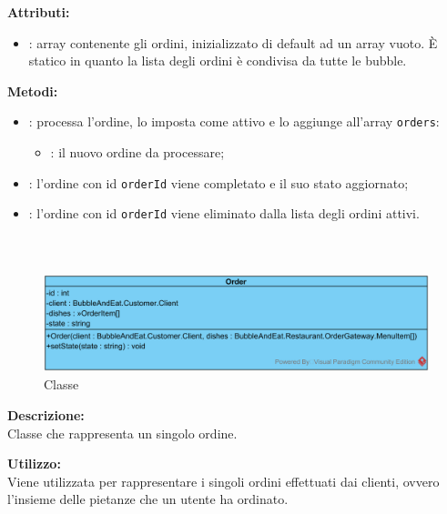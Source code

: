 \textbf{Attributi:}
\begin{itemize}
	\item {}: array contenente gli ordini, inizializzato di default ad un array vuoto. È statico in quanto la lista degli ordini è condivisa da tutte le bubble.
\end{itemize}

\textbf{Metodi:}
\begin{itemize}
	\item {}: processa l'ordine, lo imposta come attivo e lo aggiunge all'array \texttt{orders}:
	\begin{itemize}
		\item {}: il nuovo ordine da processare;
	\end{itemize}
	\item {}: l'ordine con id \texttt{orderId} viene completato e il suo stato aggiornato;
	\item {}: l'ordine con id \texttt{orderId} viene eliminato dalla lista degli ordini attivi.
\end{itemize}

\subparagraph[::Order]{\class}\mbox{}\\ \label{\class}
\begin{figure}[H]
	\centering
	\includegraphics[width=15cm]{./diagrammi/demo/server/order/order.png}
	\caption{Classe \class}
\end{figure}
\textbf{Descrizione:}\\
Classe che rappresenta un singolo ordine.

\textbf{Utilizzo:}\\
Viene utilizzata per rappresentare i singoli ordini effettuati dai clienti, ovvero l'insieme delle pietanze che un utente ha ordinato.

%

